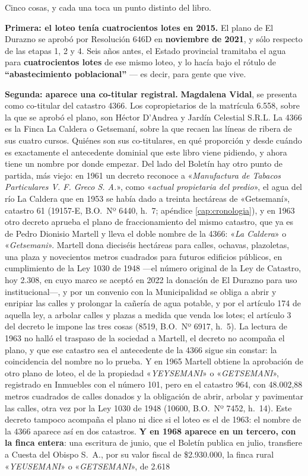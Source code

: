 \begin{cautela}
Cinco cosas, y cada una toca un punto distinto del libro.

\textbf{Primera: el loteo tenía cuatrocientos lotes en 2015.} El plano de El Durazno se aprobó por Resolución 646D en \textbf{noviembre de 2021}, y sólo respecto de las etapas 1, 2 y 4. Seis años antes, el Estado provincial tramitaba el agua para \textbf{cuatrocientos lotes} de ese mismo loteo, y lo hacía bajo el rótulo de \textbf{``abastecimiento poblacional''} --- es decir, para gente que vive.

\textbf{Segunda: aparece una co-titular registral.} \textbf{Magdalena Vidal}, se presenta como co-titular del catastro 4366. Los copropietarios de la matrícula 6.558, sobre la que se aprobó el plano, son Héctor D'Andrea y Jardín Celestial S.R.L. La 4366 es la Finca La Caldera o Getsemaní, sobre la que recaen las líneas de ribera de sus cuatro cursos. Quiénes son sus co-titulares, en qué proporción y desde cuándo es exactamente el antecedente dominial que este libro viene pidiendo, y ahora tiene un nombre por donde empezar. Del lado del Boletín hay otro punto de partida, más viejo: en 1961 un decreto reconoce a «\textit{Manufactura de Tabacos Particulares V. F. Greco S. A.}», como «\textit{actual propietaria del predio}», el agua del río La Caldera que en 1953 se había dado a treinta hectáreas de «Getsemaní», catastro 61 (19157-E, B.O.\ Nº 6440, h.\ 7; apéndice \ref{cap:cronologia}), y en 1963 otro decreto aprueba el plano de fraccionamiento del mismo catastro, que ya es de Pedro Dionisio Martell y lleva el doble nombre de la 4366: «\textit{La Caldera}» o «\textit{Getsemani}». Martell dona dieciséis hectáreas para calles, ochavas, plazoletas, una plaza y novecientos metros cuadrados para futuros edificios públicos, en cumplimiento de la Ley 1030 de 1948 ---el número original de la Ley de Catastro, hoy 2.308, en cuyo marco se aceptó en 2022 la donación de El Durazno para uso institucional---, y por un convenio con la Municipalidad se obliga a abrir y enripiar las calles y prolongar la cañería de agua potable, y por el artículo 174 de aquella ley, a arbolar calles y plazas a medida que venda los lotes; el artículo 3 del decreto le impone las tres cosas (8519, B.O.\ Nº 6917, h.\ 5). La lectura de 1963 no halló el traspaso de la sociedad a Martell, el decreto no acompaña el plano, y que ese catastro sea el antecedente de la 4366 sigue sin constar: la coincidencia del nombre no lo prueba. Y en 1965 Martell obtiene la aprobación de otro plano de loteo, el de la propiedad «\textit{YEYSEMANI}» o «\textit{GETSEMANI}», registrado en Inmuebles con el número 101, pero en el catastro 964, con 48.002,88 metros cuadrados de calles donados y la obligación de abrir, arbolar y pavimentar las calles, otra vez por la Ley 1030 de 1948 (10600, B.O.\ Nº 7452, h.\ 14). Este decreto tampoco acompaña el plano ni dice si el loteo es el de 1963: el nombre de la 4366 aparece así en dos catastros. \textbf{Y en 1968 aparece en un tercero, con la finca entera}: una escritura de junio, que el Boletín publica en julio, transfiere a Cuesta del Obispo S.\ A., por su valor fiscal de \$2.930.000, la finca rural «\textit{YEUSEMANI}» o «\textit{GETSEMANI}», de 2.618 
\end{cautela}
